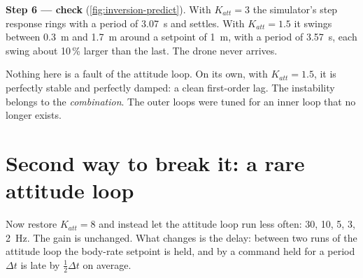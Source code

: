 \begin{example}
\textbf{Step 6 — check} (\cref{fig:inversion-predict}). With $K_{att} = 3$ the simulator's step response rings with a period of \SI{3.07}{s} and settles. With $K_{att} = 1.5$ it swings between \SI{0.3}{m} and \SI{1.7}{m} around a setpoint of \SI{1}{m}, with a period of \SI{3.57}{s}, each swing about 10\,\% larger than the last. The drone never arrives.
\end{example}


Nothing here is a fault of the attitude loop. On its own, with $K_{att} = 1.5$, it is perfectly stable and perfectly damped: a clean first-order lag. The instability belongs to the \emph{combination}. The outer loops were tuned for an inner loop that no longer exists.

\section{Second way to break it: a rare attitude loop}

Now restore $K_{att} = 8$ and instead let the attitude loop run less often: 30, 10, 5, 3, \SI{2}{Hz}. The gain is unchanged. What changes is the delay: between two runs of the attitude loop the body-rate setpoint is held, and by  a command held for a period $\Delta t$ is late by $\tfrac12\Delta t$ on average.

